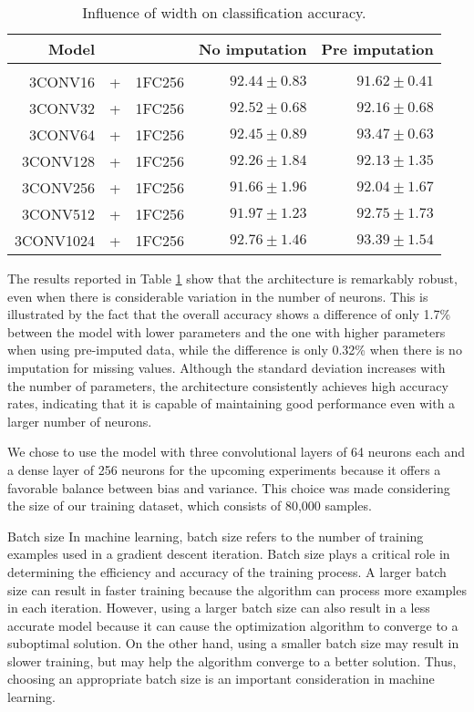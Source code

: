  \begin{table}[H]
  \centering
   \begin{tabular}{rclrr}
   Model&&                  & No imputation         & Pre imputation             \\[0.2cm]
   \hline \\[-0.2cm]
   3CONV16 &+& 1FC256    	 & $92.44 \pm 0.83$ 	 & $91.62 \pm 0.41$\\
   3CONV32 &+& 1FC256    	 & $92.52 \pm 0.68$ 	 & $92.16 \pm 0.68$\\
   3CONV64 &+& 1FC256    	 & $92.45 \pm 0.89$ 	 & $\mathbf{93.47 \pm 0.63}$\\
   3CONV128 &+& 1FC256   	 & $92.26 \pm 1.84$ 	 & $92.13 \pm 1.35$\\
   3CONV256 &+& 1FC256   	 & $91.66 \pm 1.96$ 	 & $92.04 \pm 1.67$\\
   3CONV512 &+& 1FC256   	 & $91.97 \pm 1.23$ 	 & $92.75 \pm 1.73$\\
   3CONV1024 &+& 1FC256  	 & $\mathbf{92.76 \pm 1.46}$ 	 & $93.39 \pm 1.54$\\
   \end{tabular}
   \caption{Influence of width on classification accuracy.}
   \label{tab:temCNNwidth}
 \end{table}

The results reported in Table \ref{tab:temCNNwidth} show that the architecture is remarkably robust, even when there is considerable variation in the number of neurons.
This is illustrated by the fact that the overall accuracy shows a difference of only 1.7\% between the model with lower parameters and the one with higher parameters when using pre-imputed data, while the difference is only 0.32\% when there is no imputation for missing values.
Although the standard deviation increases with the number of parameters, the architecture consistently achieves high accuracy rates, indicating that it is capable of maintaining good performance even with a larger number of neurons.

We chose to use the model with three convolutional layers of 64 neurons each and a dense layer of 256 neurons for the upcoming experiments because it offers a favorable balance between bias and variance.
This choice was made considering the size of our training dataset, which consists of 80,000 samples.

\begin{paragraph}{Batch size}
  In machine learning, batch size refers to the number of training examples used in a gradient descent iteration.
  Batch size plays a critical role in determining the efficiency and accuracy of the training process.
  A larger batch size can result in faster training because the algorithm can process more examples in each iteration.
  However, using a larger batch size can also result in a less accurate model because it can cause the optimization algorithm to converge to a suboptimal solution.
  On the other hand, using a smaller batch size may result in slower training, but may help the algorithm converge to a better solution. 
  Thus, choosing an appropriate batch size is an important consideration in machine learning.
\end{paragraph}

